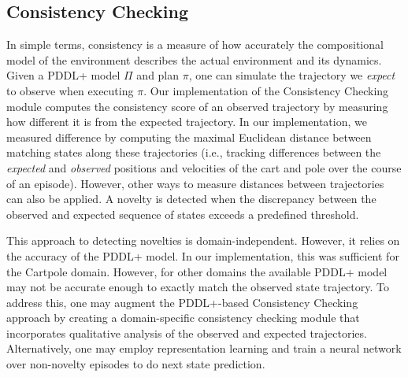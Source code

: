 \documentclass{article}
\begin{document}
\subsection{Consistency Checking}
In simple terms, consistency is a measure of how accurately the compositional model of the environment describes the actual environment and its dynamics.
Given a PDDL+ model $\Pi$ and plan $\pi$, one can simulate the trajectory we \emph{expect} to observe when executing $\pi$. 
Our implementation of the Consistency Checking module computes the consistency score of an observed trajectory by measuring how different it is from the expected trajectory. 
In our implementation, we measured difference by computing the maximal Euclidean distance 
between matching states along these trajectories (i.e., tracking differences between the \textit{expected} and \textit{observed} positions and velocities of the cart and pole over the course of an episode). 
However, other ways to measure distances between trajectories can also be applied. 
A novelty is detected when the discrepancy between the observed and expected sequence of states exceeds a predefined threshold. 


This approach to detecting novelties is domain-independent. 
However, it relies on the accuracy of the PDDL+ model. 
In our implementation, this was sufficient for the Cartpole domain.
However, for other domains the available PDDL+ model may not be accurate enough to exactly match the observed state trajectory.
To address this, one may augment the PDDL+-based Consistency Checking approach by creating a domain-specific consistency checking module that incorporates qualitative analysis of the observed and expected trajectories. Alternatively, one may employ representation learning and train a neural network over non-novelty episodes to do next state prediction. 
\end{document}

